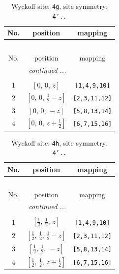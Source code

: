 \documentclass[fleqn,8pt]{jsarticle}
\begin{document}
\renewcommand{\arraystretch}{1.2}
\begin{longtable}{ccc}
\caption{Wyckoff site: {\tt 4g}, site symmetry: {\tt 4'..}}
 \\
 \hline \hline
No. & position & mapping \\ \hline \endfirsthead

\multicolumn{2}{l}{\tablename\ \thetable{}} \\
 \hline \hline
No. & position & mapping \\ \hline \endhead

 \hline \hline
\multicolumn{2}{r}{\footnotesize\it continued ...} \\ \endfoot

 \hline \hline
\multicolumn{2}{r}{} \\ \endlastfoot

1 & $\left[ 0,\, 0,\, z \right]$ & {\tt [1,4,9,10]} \\ \hline
2 & $\left[ 0,\, 0,\, \frac{1}{2} - z \right]$ & {\tt [2,3,11,12]} \\ \hline
3 & $\left[ 0,\, 0,\, - z \right]$ & {\tt [5,8,13,14]} \\ \hline
4 & $\left[ 0,\, 0,\, z + \frac{1}{2} \right]$ & {\tt [6,7,15,16]} \\
\end{longtable}
\renewcommand{\arraystretch}{1.2}
\begin{longtable}{ccc}
\caption{Wyckoff site: {\tt 4h}, site symmetry: {\tt 4'..}}
 \\
 \hline \hline
No. & position & mapping \\ \hline \endfirsthead

\multicolumn{2}{l}{\tablename\ \thetable{}} \\
 \hline \hline
No. & position & mapping \\ \hline \endhead

 \hline \hline
\multicolumn{2}{r}{\footnotesize\it continued ...} \\ \endfoot

 \hline \hline
\multicolumn{2}{r}{} \\ \endlastfoot

1 & $\left[ \frac{1}{2},\, \frac{1}{2},\, z \right]$ & {\tt [1,4,9,10]} \\ \hline
2 & $\left[ \frac{1}{2},\, \frac{1}{2},\, \frac{1}{2} - z \right]$ & {\tt [2,3,11,12]} \\ \hline
3 & $\left[ \frac{1}{2},\, \frac{1}{2},\, - z \right]$ & {\tt [5,8,13,14]} \\ \hline
4 & $\left[ \frac{1}{2},\, \frac{1}{2},\, z + \frac{1}{2} \right]$ & {\tt [6,7,15,16]} \\
\end{longtable}
\end{document}
